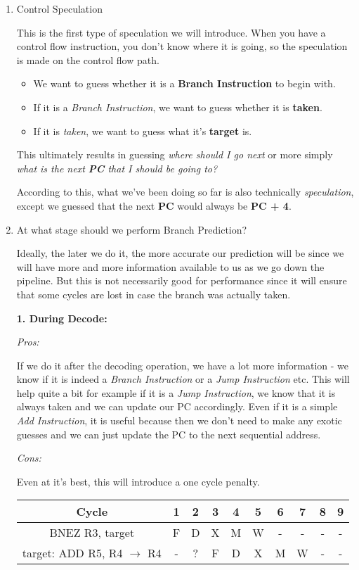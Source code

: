 \documentclass[12pt]{article}
\newenvironment{QandA}{\begin{enumerate}[label=\bfseries\alph*.]\bfseries}
                      {\end{enumerate}}
\newenvironment{answered}{\par\quad\normalfont}{}
\begin{document}
\begin{QandA}
\item Control Speculation
\begin{answered}
    This is the first type of speculation we will introduce. When you have a control flow instruction, you don't know where it is going, so the speculation is made on the control flow path. 
    \begin{itemize}
        \item We want to guess whether it is a \textbf{Branch Instruction} to begin with.
        \item If it is a \textit{Branch Instruction}, we want to guess whether it is \textbf{taken}.
        \item If it is \textit{taken}, we want to guess what it's \textbf{target} is.
    \end{itemize}
    This ultimately results in guessing \textit{where should I go next} or more simply \textit{what is the next \textbf{PC} that I should be going to?}
    
    According to this, what we've been doing so far is also technically \textit{speculation}, except we guessed that the next \textbf{PC} would always be \textbf{PC + 4}.
\end{answered}

\item At what stage should we perform Branch Prediction?
\begin{answered}
    Ideally, the later we do it, the more accurate our prediction will be since we will have more and more information available to us as we go down the pipeline. But this is not necessarily good for performance since it will ensure that some cycles are lost in case the branch was actually taken.
    
    \textbf{1. During Decode:}
    
    \textit{Pros:}
    
    If we do it after the decoding operation, we have a lot more information - we know if it is indeed a \textit{Branch Instruction} or a \textit{Jump Instruction} etc. This will help quite a bit for example if it is a \textit{Jump Instruction}, we know that it is always taken and we can update our PC accordingly. Even if it is a simple \textit{Add Instruction}, it is useful because then we don't need to make any exotic guesses and we can just update the PC to the next sequential address. 
    
    \textit{Cons:}
    
    Even at it's best, this will introduce a one cycle penalty. 
    \begin{center}
    \begin{tabular}{ |c|c|c|c|c|c|c|c|c|c| } 
     \hline
     Cycle & 1 & 2 & 3 & 4 & 5 & 6 & 7 & 8 & 9\\ 
     \hline
     BNEZ R3, target & F & D & X & M & W & - & - & - & -\\ 
     target: ADD R5, R4 $\rightarrow$ R4 & - & ? & F & D & X & M & W & - & - \\ 
     \hline
    \end{tabular}
    \end{center}   
    

\end{answered}
\end{QandA}
\end{document}
